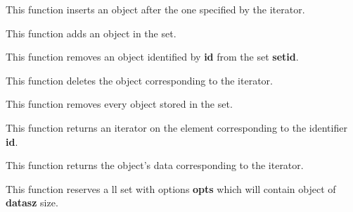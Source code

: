 
This function inserts an object after the one specified by the iterator.


This function adds an object in the set.


This function removes an object identified by \textbf{id} from the
set \textbf{setid}.


This function deletes the object corresponding to the iterator.


This function removes every object stored in the set.


This function returns an iterator on the element corresponding to the
identifier \textbf{id}.


This function returns the object's data corresponding to the iterator.


This function reserves a ll set with options \textbf{opts} which will contain
object of \textbf{datasz} size.

